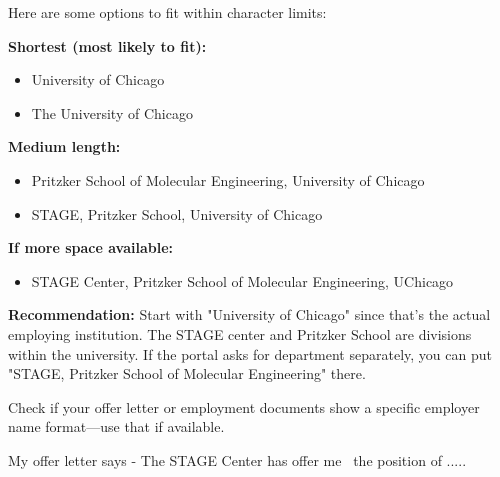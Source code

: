 \begin{botresponse}
Here are some options to fit within character limits:

\textbf{Shortest (most likely to fit):}

\begin{itemize}
\item University of Chicago
\item The University of Chicago
\end{itemize}

\textbf{Medium length:}

\begin{itemize}
\item Pritzker School of Molecular Engineering, University of Chicago
\item STAGE, Pritzker School, University of Chicago
\end{itemize}

\textbf{If more space available:}

\begin{itemize}
\item STAGE Center, Pritzker School of Molecular Engineering, UChicago
\end{itemize}

\textbf{Recommendation:} Start with "University of Chicago" since that's the actual employing institution. The STAGE center and Pritzker School are divisions within the university. If the portal asks for department separately, you can put "STAGE, Pritzker School of Molecular Engineering" there.

Check if your offer letter or employment documents show a specific employer name format—use that if available.
\end{botresponse}

\begin{userprompt}
My offer letter says - The STAGE Center has offer me  the position of .....
\end{userprompt}

